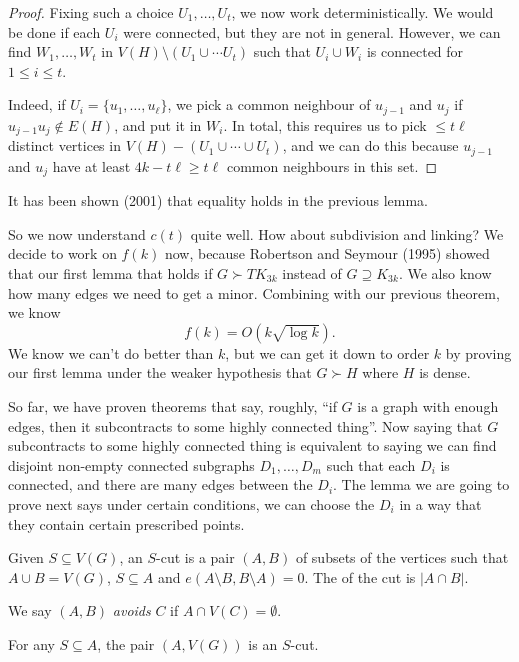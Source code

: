 \documentclass[a4paper]{article}
\begin{document}
\begin{proof}
  Fixing such a choice $U_1, \ldots, U_t$, we now work deterministically. We would be done if each $U_i$ were connected, but they are not in general. However, we can find $W_1, \ldots, W_t$ in $V(H) \setminus (U_1 \cup \cdots U_t)$ such that $U_i \cup W_i$ is connected for $1 \leq i \leq t$.

  Indeed, if $U_i = \{u_1, \ldots, u_\ell\}$, we pick a common neighbour of $u_{j - 1}$ and $u_j$ if $u_{j - 1} u_j \not \in E(H)$, and put it in $W_i$. In total, this requires us to pick $\leq t\ell$ distinct vertices in $V(H) - (U_1 \cup \cdots \cup U_t)$, and we can do this because $u_{j - 1}$ and $u_j$ have at least $4k - t\ell \geq t\ell$ common neighbours in this set.
\end{proof}

It has been shown (2001) that equality holds in the previous lemma.

So we now understand $c(t)$ quite well. How about subdivision and linking? We decide to work on $f(k)$ now, because Robertson and Seymour (1995) showed that our first lemma that holds if $G \succ TK_{3k}$ instead of $G \supseteq K_{3k}$. We also know how many edges we need to get a minor. Combining with our previous theorem, we know
\[
  f(k) = O(k \sqrt{\log k}).
\]
We know we can't do better than $k$, but we can get it down to order $k$ by proving our first lemma under the weaker hypothesis that $G \succ H$ where $H$ is dense.

So far, we have proven theorems that say, roughly, ``if $G$ is a graph with enough edges, then it subcontracts to some highly connected thing''. Now saying that $G$ subcontracts to some highly connected thing is equivalent to saying we can find disjoint non-empty connected subgraphs $D_1, \ldots, D_m$ such that each $D_i$ is connected, and there are many edges between the $D_i$. The lemma we are going to prove next says under certain conditions, we can choose the $D_i$ in a way that they contain certain prescribed points.

\begin{defi}[$S$-cut]
  Given $S \subseteq V(G)$, an $S$-cut is a pair $(A, B)$ of subsets of the vertices such that $A \cup B = V(G)$, $S \subseteq A$ and $e(A \setminus B, B \setminus A) = 0$. The  of the cut is $|A \cap B|$.

  We say $(A, B)$ \emph{avoids} $C$ if $A \cap V(C) = \emptyset$.
\end{defi}

\begin{eg}
  For any $S \subseteq A$, the pair $(A, V(G))$ is an $S$-cut.
\end{eg}
\end{document}

